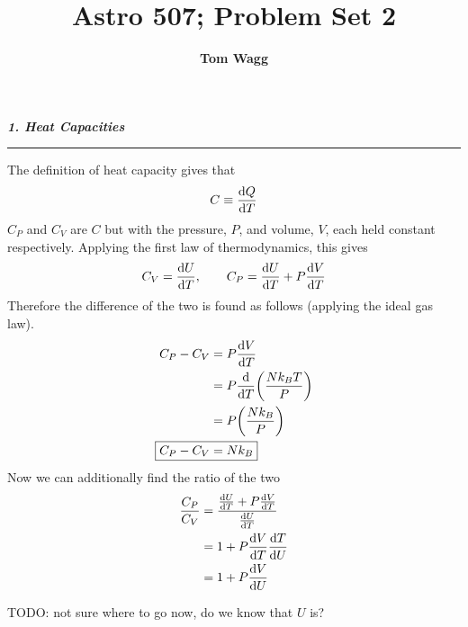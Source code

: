 \documentclass[12pt, letterpaper, twoside]{article}
\title{Astro 507; Problem Set 2}
\author{\textbf{Tom Wagg}}
\newcommand{\question}[1]{{\noindent \it #1}}
\newcommand{\answer}[1]{
    \par\noindent\rule{\textwidth}{0.4pt}#1\vspace{0.5cm}
}
\newcommand{\todo}[1]{{\color{red}\begin{center}TODO: #1\end{center}}}
\begin{document}
\maketitle

\question{\textbf{1. Heat Capacities}}
\answer{
    The definition of heat capacity gives that
    \begin{equation}
        C \equiv \dv{Q}{T}
    \end{equation}
    $C_P$ and $C_V$ are $C$ but with the pressure, $P$, and volume, $V$, each held constant respectively. Applying the first law of thermodynamics, this gives
    \begin{equation}
        C_V = \dv{U}{T},\qquad C_P = \dv{U}{T} + P \dv{V}{T}
    \end{equation}
    Therefore the difference of the two is found as follows (applying the ideal gas law).
    \begin{align}
        C_P - C_V &= P \dv{V}{T} \\
                  &= P \dv{T} \qty(\frac{N k_B T}{P}) \\
                  &= P \qty(\frac{N k_B}{P}) \\
        \Aboxed{ C_P - C_V &= N k_B }
    \end{align}
    Now we can additionally find the ratio of the two
    \begin{align}
        \frac{C_P}{C_V} &= \frac{\dv{U}{T} + P \dv{V}{T}}{\dv{U}{T}} \\
                        &= 1 + P \dv{V}{T} \dv{T}{U} \\
                        &= 1 + P \dv{V}{U}
    \end{align}
    \todo{not sure where to go now, do we know that $U$ is?} 
}

\pagebreak
\end{document}
